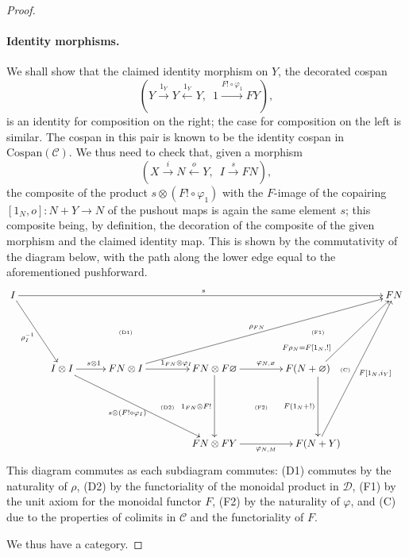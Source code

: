 \begin{proof}
\paragraph{Identity morphisms.} 
We shall show that the claimed identity morphism on $Y$, the decorated cospan
\[
  (Y \stackrel{1_Y}\longrightarrow Y \stackrel{1_Y}\longleftarrow Y,\enspace 1
\stackrel{F!\circ \varphi_1}\longrightarrow FY),
\]
is an identity for composition
on the right; the case for composition on the left is similar. The cospan in
this pair is known to be the identity cospan in $\mathrm{Cospan}(\mathcal C)$.
We thus need to check that, given a morphism 
\[
  (X \stackrel{i}\longrightarrow N
\stackrel{o}\longleftarrow Y,\enspace I \stackrel{s}\longrightarrow FN),
\] 
the composite of the product $s \otimes (F! \circ \varphi_1)$ with the $F$-image
of the copairing \linebreak $[1_N,o]\colon  N+Y \to N$ of the pushout maps is
again the same element $s$; this composite being, by definition, the decoration
of the composite of the given morphism and the claimed identity map. This is
shown by the commutativity of the diagram below, with the path along the lower
edge equal to the aforementioned pushforward.
\[
  \xymatrixcolsep{.96pc}
  \xymatrix{
    I \ar[rrrrrrrrrr]^s \ar[ddrr]_{\rho_I^{-1}} &&&&&&&&&& FN \\
    &&&& \textrm{\tiny(D1)} &&&& \textrm{\tiny(F1)}\\
    && I \otimes I \ar[rr]^{s\otimes 1} \ar[ddrrrr]_{s \otimes (F! \circ
    \varphi_I)} && FN \otimes I \ar[uurrrrrr]^{\rho_{FN}} \ar[rr]^(.57){1_{FN}
  \otimes \varphi_I}
    && FN \otimes F\varnothing \ar[rr]^{\varphi_{N,\varnothing}} \ar[dd]_{1_{FN}
  \otimes F!} && F(N+\varnothing) \ar[uurr]^(.2){F\rho_N=F[1_N,!]}
      \ar[dd]_{F(1_N+!)} \quad \textrm{\tiny(C)}\\
      &&&&& \textrm{\tiny(D2)} && \textrm{\tiny(F2)}\\
      &&&&&& FN \otimes FY \ar[rr]_{\varphi_{N,M}} && F(N+Y)
      \ar[uuuurr]_{F[1_N,i_Y]}
  }
\]
This diagram commutes as each subdiagram commutes: (D1) commutes by the
naturality of $\rho$, (D2) by the functoriality of the monoidal product in
$\mathcal D$, (F1) by the unit axiom for the monoidal functor $F$, (F2) by the
naturality of $\varphi$, and (C) due to the properties of colimits in $\mathcal
C$ and the functoriality of $F$.

We thus have a category.
\end{proof}

